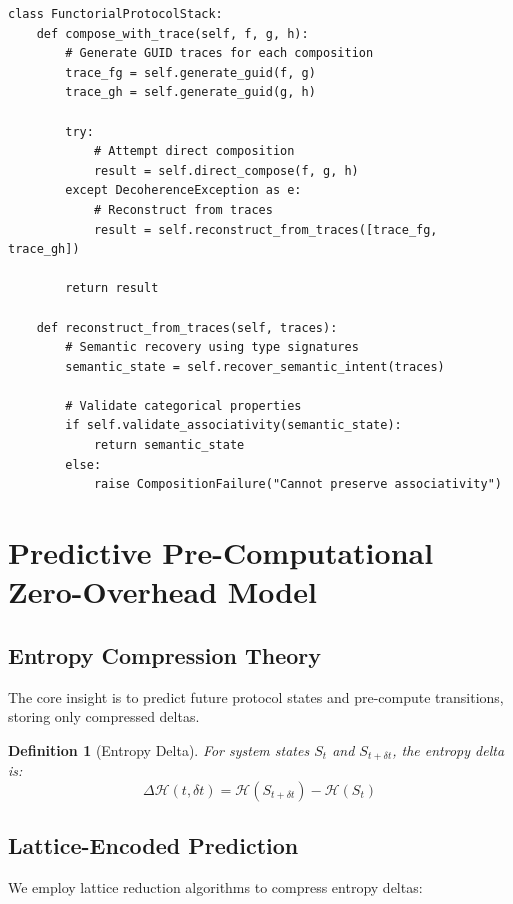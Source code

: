 \documentclass[11pt,a4paper]{article}
\newtheorem{definition}[theorem]{Definition}
\newcommand{\entropy}{\mathcal{H}}
\newcommand{\deltaentropy}{\Delta\entropy}
\begin{document}
\begin{verbatim}
class FunctorialProtocolStack:
    def compose_with_trace(self, f, g, h):
        # Generate GUID traces for each composition
        trace_fg = self.generate_guid(f, g)
        trace_gh = self.generate_guid(g, h)
        
        try:
            # Attempt direct composition
            result = self.direct_compose(f, g, h)
        except DecoherenceException as e:
            # Reconstruct from traces
            result = self.reconstruct_from_traces([trace_fg, trace_gh])
            
        return result
        
    def reconstruct_from_traces(self, traces):
        # Semantic recovery using type signatures
        semantic_state = self.recover_semantic_intent(traces)
        
        # Validate categorical properties
        if self.validate_associativity(semantic_state):
            return semantic_state
        else:
            raise CompositionFailure("Cannot preserve associativity")
\end{verbatim}

\section{Predictive Pre-Computational Zero-Overhead Model}

\subsection{Entropy Compression Theory}

The core insight is to predict future protocol states and pre-compute transitions, storing only compressed deltas.

\begin{definition}[Entropy Delta]
For system states $S_t$ and $S_{t+\delta t}$, the entropy delta is:
\begin{equation}
\deltaentropy(t, \delta t) = \entropy(S_{t+\delta t}) - \entropy(S_t)
\end{equation}
\end{definition}

\subsection{Lattice-Encoded Prediction}

We employ lattice reduction algorithms to compress entropy deltas:
\end{document}
